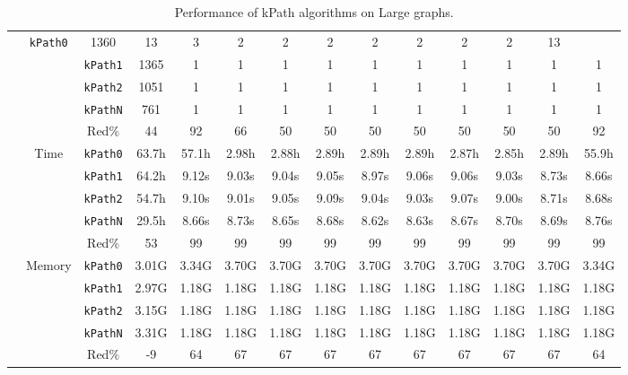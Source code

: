 \begin{table}[h!]
{\begin{tabular}{|l|c|c|c|c|c|c|c|c|c|c|c|c|c|}
& \texttt{kPath0} & 1360 & 13 & 3 & 2 & 2 & 2 & 2 & 2 & 2 & 2 & 13 \\
& & \texttt{kPath1} & 1365 & 1 & 1 & 1 & 1 & 1 & 1 & 1 & 1 & 1 & 1 \\
& & \texttt{kPath2} & 1051 & 1 & 1 & 1 & 1 & 1 & 1 & 1 & 1 & 1 & 1 \\
& & \texttt{kPathN} & 761 & 1 & 1 & 1 & 1 & 1 & 1 & 1 & 1 & 1 & 1 \\
& & Red$\%$ & 44 & 92 & 66 & 50 & 50 & 50 & 50 & 50 & 50 & 50 & 92 \\
\cline{2-14} &
\multirow{5}{*}{Time}
& \texttt{kPath0} & 63.7h & 57.1h & 2.98h & 2.88h & 2.89h & 2.89h & 2.89h & 2.87h & 2.85h & 2.89h & 55.9h \\
& & \texttt{kPath1} & 64.2h & 9.12s & 9.03s & 9.04s & 9.05s & 8.97s & 9.06s & 9.06s & 9.03s & 8.73s & 8.66s \\
& & \texttt{kPath2} & 54.7h & 9.10s & 9.01s & 9.05s & 9.09s & 9.04s & 9.03s & 9.07s & 9.00s & 8.71s & 8.68s \\
& & \texttt{kPathN} & 29.5h & 8.66s & 8.73s & 8.65s & 8.68s & 8.62s & 8.63s & 8.67s & 8.70s & 8.69s & 8.76s \\
& & Red$\%$ & 53 & 99 & 99 & 99 & 99 & 99 & 99 & 99 & 99 & 99 & 99 \\
\cline{2-14} &
\multirow{5}{*}{Memory}
& \texttt{kPath0} & 3.01G & 3.34G & 3.70G & 3.70G & 3.70G & 3.70G & 3.70G & 3.70G & 3.70G & 3.70G & 3.34G \\
& & \texttt{kPath1} & 2.97G & 1.18G & 1.18G & 1.18G & 1.18G & 1.18G & 1.18G & 1.18G & 1.18G & 1.18G & 1.18G \\
& & \texttt{kPath2} & 3.15G & 1.18G & 1.18G & 1.18G & 1.18G & 1.18G & 1.18G & 1.18G & 1.18G & 1.18G & 1.18G \\
& & \texttt{kPathN} & 3.31G & 1.18G & 1.18G & 1.18G & 1.18G & 1.18G & 1.18G & 1.18G & 1.18G & 1.18G & 1.18G \\
& & Red$\%$ & -9 & 64 & 67 & 67 & 67 & 67 & 67 & 67 & 67 & 67 & 64 \\
\hline
\end{tabular}%
}
\caption{Performance of kPath algorithms on Large graphs.}
\label{tab:large_kpath}
\end{table}
